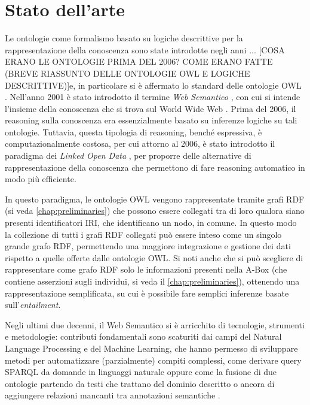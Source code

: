 \chapter[Stato dell'arte]{Stato dell'arte}
\label{chap:State-of-art}
Le ontologie come formalismo basato su logiche descrittive per la rappresentazione della conoscenza sono state introdotte \bvv negli anni ... [COSA ERANO LE ONTOLOGIE PRIMA DEL 2006? COME ERANO FATTE (BREVE RIASSUNTO DELLE ONTOLOGIE OWL E LOGICHE DESCRITTIVE)]\evv e, in particolare si è affermato lo standard delle ontologie OWL \cite{}. Nell'anno 2001 è stato introdotto il termine \emph{Web Semantico} \cite{}, \bvv con cui si intende l'insieme della conoscenza che si trova sul World Wide Web \evv. Prima del 2006, il reasoning sulla conoscenza era essenzialmente basato su inferenze logiche su tali ontologie. Tuttavia, questa tipologia di reasoning, benché espressiva, è computazionalmente costosa, per cui attorno al 2006, è stato introdotto il paradigma dei \textit{Linked Open Data} \cite{hitzler2021review}, per proporre delle alternative di rappresentazione della conoscenza che permettono di fare reasoning automatico in modo più efficiente. 

In questo paradigma, le ontologie OWL vengono rappresentate tramite grafi RDF (si veda \autoref{chap:preliminaries}) che possono essere collegati tra di loro qualora siano presenti identificatori IRI, che identificano un nodo, in comune. In questo modo la collezione di tutti i grafi RDF collegati può essere inteso come un singolo grande grafo RDF, permettendo una maggiore integrazione e gestione dei dati rispetto a quelle offerte dalle ontologie OWL. Si noti anche che si può scegliere di rappresentare come grafo RDF solo le informazioni presenti nella A-Box (che contiene asserzioni sugli individui, si veda il \autoref{chap:preliminaries}), ottenendo una rappresentazione semplificata, su cui è possibile fare semplici inferenze basate sull'\emph{entailment}.

Negli ultimi due decenni, il Web Semantico si è arricchito di tecnologie, strumenti e metodologie: contributi fondamentali sono scaturiti dai campi del Natural Language Processing e del Machine Learning, che hanno permesso di sviluppare metodi per automatizzare (parzialmente) compiti complessi, come derivare query SPARQL da domande in linguaggi naturale \cite{Evseev2020SPARQLQG, Zlatareva2021ProcessingNL, Hu2021NaturalLQ} oppure come la fusione di due ontologie partendo da testi che trattano del dominio descritto \cite{caldarolaMultiStrategyApproach} o ancora di aggiungere relazioni mancanti tra annotazioni semantiche \cite{discoveringmissingsemanticrelation, repairinghiddenlinks}. 

